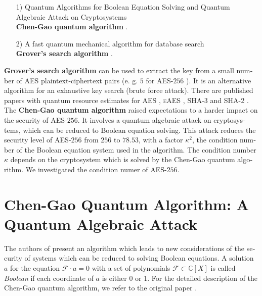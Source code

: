\documentclass[a4paper,11pt]{article}
\begin{document}
\begin{otherlanguage}{english}
\begin{itemize} [noitemsep, nolistsep]
  \item[1)] Quantum Algorithms for Boolean Equation Solving and Quantum Algebraic Attack on Cryptosystems \\
  \textbf{Chen-Gao quantum algorithm} \cite{QAA}.
  \vspace{0.1cm}
  \item[2)] A fast quantum mechanical algorithm for database search \\
  \textbf{Grover’s search algorithm} \cite{GRV}.
  \vspace{0.1cm}
\end{itemize}
\vspace{0.5cm}

\noindent
\textbf{Grover’s search algorithm} can be used to extract the key from a small number of \textsc{AES} plaintext-ciphertext pairs (e. g. $5$ for \textsc{AES}-$256$ \cite{GRO}). It is an alternative algorithm for an exhaustive key search (brute force attack). There are published papers with quantum resource estimates for \textsc{AES} \cite{GRO}, \textsc{eAES} \cite{KUN, CEX}, \textsc{SHA-3} \cite{QSH} and \textsc{SHA-2} \cite{QSH}. \\

\noindent
The \textbf{Chen-Gao quantum algorithm} raised expectations to a harder impact on the security of \textsc{AES}-$256$. It involves a quantum algebraic attack on cryptosystems, which can be reduced to Boolean equation solving. This attack reduces the security level of \textsc{AES}-$256$ from $256$ to $78.53$, with a factor $\kappa^2$, the condition number of the Boolean equation system used in the algorithm. The condition number $\kappa$ depends on the cryptosystem which is solved by the Chen-Gao quantum algorithm. We investigated the condition numer of \textsc{AES}-$256$. \\


\section{Chen-Gao Quantum Algorithm: A Quantum Algebraic Attack}

\noindent
The authors of \cite{QAA} present an algorithm which leads to new considerations of the security of systems which can be reduced to solving Boolean equations. A solution $a$ for the equation $\mathcal{F} \cdot a = 0$ with a set of polynomials $\mathcal{F} \subset \mathbb{C}[X]$ is called \textit{Boolean} if each coordinate of $a$ is either $0$ or $1$. For the detailed description of the Chen-Gao quantum algorithm, we refer to the original paper \cite{QAA}.\\


\end{otherlanguage}
\end{document}
